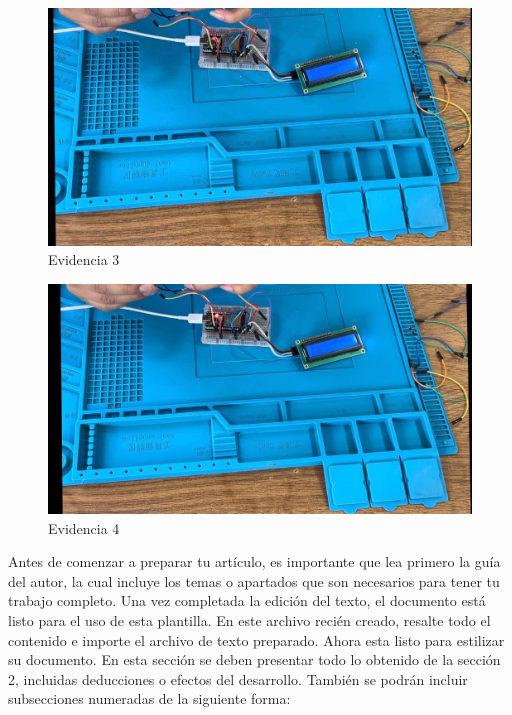     \begin{figure}[H]
        \centering
        \includegraphics[trim = {0mm 0mm 0mm 0mm},clip,scale=0.2]{8/Img/Evidencia 3.pdf}
        \caption{Evidencia 3}
        \label{Evidencia 3}
    \end{figure}
    
    \begin{figure}[H]
        \centering
        \includegraphics[trim = {0mm 0mm 0mm 0mm},clip,scale=0.2]{8/Img/Evidencia 4.pdf}
        \caption{Evidencia 4}
        \label{Evidencia 4}
    \end{figure}
    
    Antes de comenzar a preparar tu artículo, es importante que lea primero la guía del autor, la cual incluye los temas o apartados que son necesarios para tener tu trabajo completo.
    Una vez completada la edición del texto, el documento está listo para el uso de esta plantilla. En este archivo recién creado, resalte todo el contenido e importe el archivo de texto preparado. Ahora esta listo para estilizar su documento.
    En esta sección se deben presentar todo lo obtenido de la sección 2, incluidas deducciones o efectos del desarrollo. También se podrán incluir subsecciones numeradas de la siguiente forma:
    

